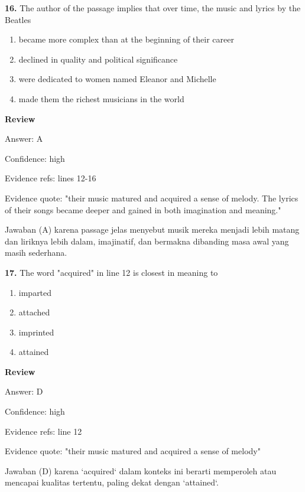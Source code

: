 \documentclass[12pt]{article}
\begin{document}
\endgroup
\par
\vspace{0.25\baselineskip}
\noindent\textbf{16.} The author of the passage implies that over time, the music and lyrics by the Beatles
\begin{enumerate}[label=(\Alph*),leftmargin=*,itemsep=0.2em]
\item became more complex than at the beginning of their career
\item declined in quality and political significance
\item were dedicated to women named Eleanor and Michelle
\item made them the richest musicians in the world
\end{enumerate}
\par
\begingroup
\setlength{\parskip}{0pt}
\setlength{\parindent}{0pt}
\textbf{Review}\par
Answer: A\par
Confidence: high\par
Evidence refs: lines 12-16\par
Evidence quote: "their music matured and acquired a sense of melody. The lyrics of their songs became deeper and gained in both imagination and meaning."\par
Jawaban (A) karena passage jelas menyebut musik mereka menjadi lebih matang dan liriknya lebih dalam, imajinatif, dan bermakna dibanding masa awal yang masih sederhana.\par
\endgroup
\par
\vspace{0.25\baselineskip}
\noindent\textbf{17.} The word "acquired" in line 12 is closest in meaning to
\begin{enumerate}[label=(\Alph*),leftmargin=*,itemsep=0.2em]
\item imparted
\item attached
\item imprinted
\item attained
\end{enumerate}
\par
\begingroup
\setlength{\parskip}{0pt}
\setlength{\parindent}{0pt}
\textbf{Review}\par
Answer: D\par
Confidence: high\par
Evidence refs: line 12\par
Evidence quote: "their music matured and acquired a sense of melody"\par
Jawaban (D) karena `acquired` dalam konteks ini berarti memperoleh atau mencapai kualitas tertentu, paling dekat dengan `attained`.\par
\end{document}
